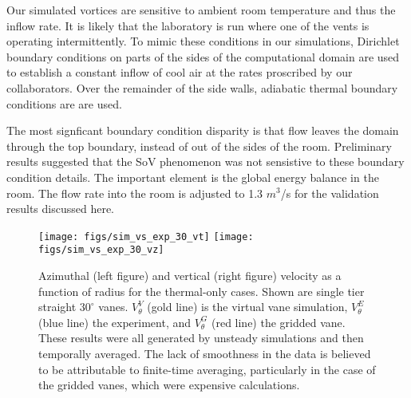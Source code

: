 Our simulated vortices are sensitive to ambient room temperature and thus 
the inflow rate. It is likely that the laboratory is run where one of
the vents is operating intermittently. 
To mimic these conditions in our simulations, Dirichlet boundary conditions 
on parts of the sides of the computational domain are used to
establish a constant inflow of cool air at the rates 
proscribed by our collaborators. Over the remainder of the side walls, 
adiabatic thermal boundary conditions are are used. 

The most signficant boundary condition disparity is that flow leaves the
domain through the top boundary, instead of out of the sides of the
room. Preliminary results suggested that the SoV phenomenon  was not
sensistive to these boundary condition details. The important element is
the  global energy balance in the room. The flow rate into the room is
adjusted to  1.3 $m^3$/s for the validation results discussed here.  


\begin{figure}[htp!]

  \centering
  \texttt{[image: figs/sim\_vs\_exp\_30\_vt]}
 \hfill
 \texttt{[image: figs/sim\_vs\_exp\_30\_vz]}%
 \caption{Azimuthal (left figure) and vertical (right figure) velocity 
 as a function of radius for the thermal-only cases. Shown are single
 tier straight $30^{\circ}$ vanes. $V_{\theta}^V$ (gold line) is
 the virtual vane simulation, $V_{\theta}^E$ (blue line) the experiment,
 and $V_{\theta}^G$ (red line) the gridded vane. These results were all
 generated by unsteady simulations and then temporally averaged. 
 The lack of smoothness in the data is believed to be
 attributable to finite-time averaging, particularly in the case of the
 gridded vanes, which were expensive calculations. }   
 \label{fig:val_lab}  
\end{figure}

